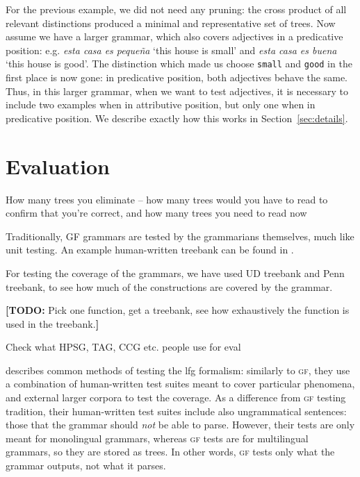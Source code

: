 \documentclass[11pt]{article}
\def\t#1{\texttt{#1}}
\def\gf{\textsc{gf}}
\newcommand{\todo}[1]{{\color{cyan}\textbf{[TODO: }#1\textbf{]}}}
\begin{document}
For the previous example, we did not need any pruning: the cross
product of all relevant distinctions produced a minimal and
representative set of trees. Now assume we have a larger grammar,
which also covers adjectives in a predicative position:
e.g. \emph{esta casa es peque\~{n}a} `this house is small' and
\emph{esta casa es buena} `this house is good'. The distinction which
made us choose \t{small} and \t{good} in the first place is now gone:
in predicative position, both adjectives behave the same. Thus, in
this larger grammar, when we want to test adjectives, it is necessary
to include two examples when in attributive position, but only one
when in predicative position. We describe exactly how this works in
Section~\ref{sec:details}. 


\section{Evaluation}

How many trees you eliminate -- how many trees would you have to read
to confirm that you're correct, and how many trees you need to read
now

Traditionally, GF grammars are tested by the grammarians themselves,
much like unit testing. An example human-written treebank can be found
in \cite[p.~136--142]{khegai2006phd}.

For testing the coverage of the grammars, we have used UD treebank
\cite{nivre2016ud} and Penn treebank, to see how much of the
constructions are covered by the grammar.

\todo{Pick one function, get a treebank, see how exhaustively the function
is used in the treebank.}

Check what HPSG, TAG, CCG etc. people use for eval

\cite[pp.~212--213]{butt1999lfg} describes common methods of testing the
{\sc lfg} formalism: similarly to \gf, they use a combination of
human-written test suites meant to cover particular phenomena, and
external larger corpora to test the coverage. As a difference from \gf{}
testing tradition, their human-written test suites include also
ungrammatical sentences: those that the grammar should \emph{not} be
able to parse. However, their tests are only meant for monolingual
grammars, whereas \gf{} tests are for multilingual grammars, so they are
stored as trees. In other words, \gf{} tests only what the grammar
outputs, not what it parses.
\end{document}
